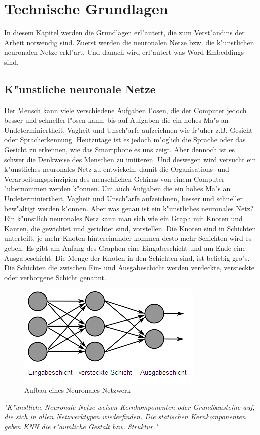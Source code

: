 
\chapter{Technische Grundlagen}
In diesem Kapitel werden die Grundlagen erl"autert, die zum Verst"andins der Arbeit notwendig sind.
Zuerst werden die neuronalen Netze bzw. die k"unstlichen neuronalen Netze erkl"art.
Und danach wird erl"autert was Word Embeddings sind.
\\

\section{K"unstliche neuronale Netze}
Der Mensch kann viele verschiedene Aufgaben l"osen, die der Computer jedoch besser und schneller l"osen kann, bis auf Aufgaben die ein hohes Ma"s an Undeterminiertheit, Vagheit und Unsch"arfe aufzeichnen wie fr"uher z.B. Gesicht- oder Spracherkennung. Heutzutage ist es jedoch m"oglich die Sprache oder das Gesicht zu erkennen, wie das Smartphone es uns zeigt. Aber dennoch ist es schwer die Denkweise des Menschen zu imiiteren. Und deswegen wird versucht ein k"unstliches neuronales Netz zu entwickeln, damit die Organisations- und Verarbeitungsprinzipien des menschlichen Gehirns von einem Computer "ubernommen werden k"onnen. Um auch Aufgaben die ein hohes Ma"s an Undeterminiertheit, Vagheit und Unsch"arfe aufzeichnen, besser und schneller bew"altigt werden k"onnen. Aber was genau ist ein k"unstliches neuronales Netz? 
Ein k"unstlich neuronales Netz kann man sich wie ein Graph mit Knoten und Kanten, die gewichtet und gerichtet sind, vorstellen. Die Knoten sind in Schichten unterteilt, je mehr Knoten hintereinander kommen desto mehr Schichten wird es geben. Es gibt am Anfang des Graphen eine Eingabeschicht und am Ende eine Ausgabeschicht. Die Menge der Knoten in den Schichten sind, ist beliebig gro"s. Die Schichten die zwischen Ein- und Ausgabeschicht werden verdeckte, versteckte oder verborgene Schicht genannt. 
\begin{figure}[bth]
\includegraphics{Graphics/neuronales_netz.png}
\caption[Neuronales Netzwerk]{Aufbau eines Neuronales Netzwerk  \cite{todesco:2018}}
\end{figure}
\textit{"K"unstliche Neuronale Netze weisen Kernkomponenten oder Grundbausteine auf, die sich in allen Netzwerktypen wiederfinden. Die statischen Kernkomponenten geben KNN die r"aumliche Gestalt bzw. Struktur."}
\cite{Strecker97}



